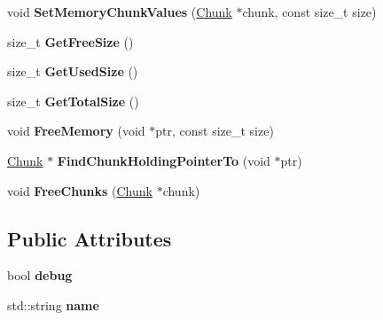 \begin{DoxyCompactItemize}
\item 
\hypertarget{class_cobra_1_1internal_1_1_memory_pool_af86688f36893a90ba0afdff8c53fb373}{void {\bfseries Set\+Memory\+Chunk\+Values} (\hyperlink{struct_cobra_1_1internal_1_1_chunk}{Chunk} $\ast$chunk, const size\+\_\+t size)}\label{class_cobra_1_1internal_1_1_memory_pool_af86688f36893a90ba0afdff8c53fb373}

\item 
\hypertarget{class_cobra_1_1internal_1_1_memory_pool_acae31710b60e0a0b99909ce759a1022f}{size\+\_\+t {\bfseries Get\+Free\+Size} ()}\label{class_cobra_1_1internal_1_1_memory_pool_acae31710b60e0a0b99909ce759a1022f}

\item 
\hypertarget{class_cobra_1_1internal_1_1_memory_pool_ab047f6a993233b70ae66a3cbec2b5e44}{size\+\_\+t {\bfseries Get\+Used\+Size} ()}\label{class_cobra_1_1internal_1_1_memory_pool_ab047f6a993233b70ae66a3cbec2b5e44}

\item 
\hypertarget{class_cobra_1_1internal_1_1_memory_pool_a8b9a8eec5a44d705656444f626c968df}{size\+\_\+t {\bfseries Get\+Total\+Size} ()}\label{class_cobra_1_1internal_1_1_memory_pool_a8b9a8eec5a44d705656444f626c968df}

\item 
\hypertarget{class_cobra_1_1internal_1_1_memory_pool_a3f9f5da3e5d0acc17341048d944363a2}{void {\bfseries Free\+Memory} (void $\ast$ptr, const size\+\_\+t size)}\label{class_cobra_1_1internal_1_1_memory_pool_a3f9f5da3e5d0acc17341048d944363a2}

\item 
\hypertarget{class_cobra_1_1internal_1_1_memory_pool_af9498f134a34ec3df45de28f438e5ab6}{\hyperlink{struct_cobra_1_1internal_1_1_chunk}{Chunk} $\ast$ {\bfseries Find\+Chunk\+Holding\+Pointer\+To} (void $\ast$ptr)}\label{class_cobra_1_1internal_1_1_memory_pool_af9498f134a34ec3df45de28f438e5ab6}

\item 
\hypertarget{class_cobra_1_1internal_1_1_memory_pool_a9256cb07ff212e7b42a0a6abc28bb1a0}{void {\bfseries Free\+Chunks} (\hyperlink{struct_cobra_1_1internal_1_1_chunk}{Chunk} $\ast$chunk)}\label{class_cobra_1_1internal_1_1_memory_pool_a9256cb07ff212e7b42a0a6abc28bb1a0}

\end{DoxyCompactItemize}
\subsection*{Public Attributes}
\begin{DoxyCompactItemize}
\item 
\hypertarget{class_cobra_1_1internal_1_1_memory_pool_abe102089faa7e8672fa58c47f4687aeb}{bool {\bfseries debug}}\label{class_cobra_1_1internal_1_1_memory_pool_abe102089faa7e8672fa58c47f4687aeb}

\item 
\hypertarget{class_cobra_1_1internal_1_1_memory_pool_ab60b9f0a574f9bbed4c582dd768e8ca5}{std\+::string {\bfseries name}}\label{class_cobra_1_1internal_1_1_memory_pool_ab60b9f0a574f9bbed4c582dd768e8ca5}

\end{DoxyCompactItemize}


